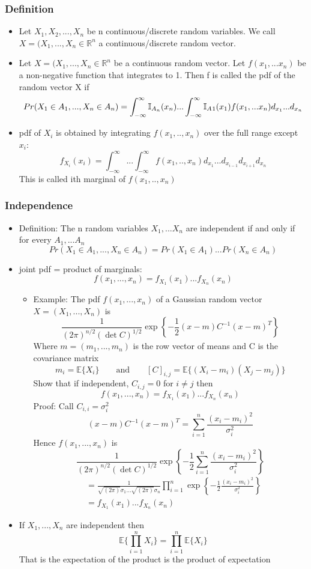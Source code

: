 \documentclass[12pt]{article}
\begin{document}
\subsubsection{Definition}
\begin{itemize}
\item Let $X_1,X_2,...,X_n$ be n continuous/discrete random variables. We call $X=(X_1,...,X_n \in \mathbb{R}^n$ a continuous/discrete random vector.
\item Let $X=(X_1,...,X_n \in \mathbb{R}^n$ be a continuous random vector. Let $f(x_1,...x_n)$ be a non-negative function that integrates to 1. Then f is called the pdf of the random vector X if 
\[Pr(X_1 \in A_1,...,X_n \in A_n) \\
= \int_{-\infty}^{\infty}\mathbb{I}_{A_n}(x_n)...\int_{-\infty}^{\infty}\mathbb{I}_A{}_1(x_1)f(x_1,...x_n)d_{x_1}...d_{x_n}
\]
\item pdf of $X_i$ is obtained by integrating $f(x_1,..,x_n)$ over the full range except $x_i$:
\[f_{X_i}(x_i) = \int_{-\infty}^{\infty}...\int_{-\infty}^{\infty}f(x_1,..,x_n)d_{x_1}...d_{x_{i-1}}d_{x_{i+1}}d_{x_n}
\]
This is called ith marginal of $f(x_1,..,x_n)$
\end{itemize}
\subsubsection{Independence}
\begin{itemize}
\item Definition: The n random variables $X_1,...X_n$ are independent if and only if for every $A_1,...A_n$
\[ Pr(X_1 \in A_1,...,X_n \in A_n) = Pr(X_1 \in A_1)...Pr(X_n \in A_n)
\]
\item joint pdf = product of marginals:
\[ f(x_1,...,x_n) = f_{X_1}(x_1)...f_{X_n}(x_n)
\]
\begin{itemize}
\item Example: The pdf $f(x_1,...,x_n)$ of a Gaussian random vector $X=(X_1,...,X_n)$ is 
\[ \frac{1}{(2\pi )^{n/2}(\det C)^{1/2}} \exp \left\{ -\frac{1}{2}(x-m)C^{-1}(x-m)^T  \right\}
\]
Where $m=(m_1,...,m_n)$ is the row vector of means and C is the covariance matrix
\[
m_i = \mathbb{E}\{X_i\} \qquad \textrm{and} \qquad [C]_{i,j}=\mathbb{E}\{(X_i - m_i) (X_j - m_j)\}
\]
Show that if independent, $C_{i,j} = 0$ for $i\not = j$ then 
\[f(x_1,...,x_n) = f_{X_1}(x_1)...f_{X_n}(x_n)
\]
Proof: Call $C_{i,i} = \sigma_i^2 $
\[
(x-m)C^{-1}(x-m)^T = \sum_{i=1}^n \frac{(x_i-m_i)^2}{\sigma_i^2}
\]
Hence $f(x_1,...,x_n)$ is 
\[
\frac{1}{(2\pi )^{n/2}(\det C)^{1/2}} \exp \left\{ -\frac{1}{2} \sum_{i=1}^n \frac{(x_i-m_i)^2}{\sigma_i^2}  \right\} 
\]
\begin{align*}
&= \frac{1}{\sqrt{(2\pi)}\sigma_1 ... \sqrt{(2\pi)}\sigma_n} \prod_{i=1}^n \exp \left\{ -\frac{1}{2}  \frac{(x_i-m_i)^2}{\sigma_i^2}  \right\} \\
&= f_{X_1}(x_1)...f_{X_n}(x_n)
\end{align*}
\end{itemize}
\item If $X_1,...,X_n$ are independent then 
$$\mathbb{E}\{\prod_{i=1}^n X_i \} = \prod_{i=1}^n \mathbb{E}\{X_i\}$$
That is the expectation of the product is the product of expectation
\end{itemize}
\end{document}
